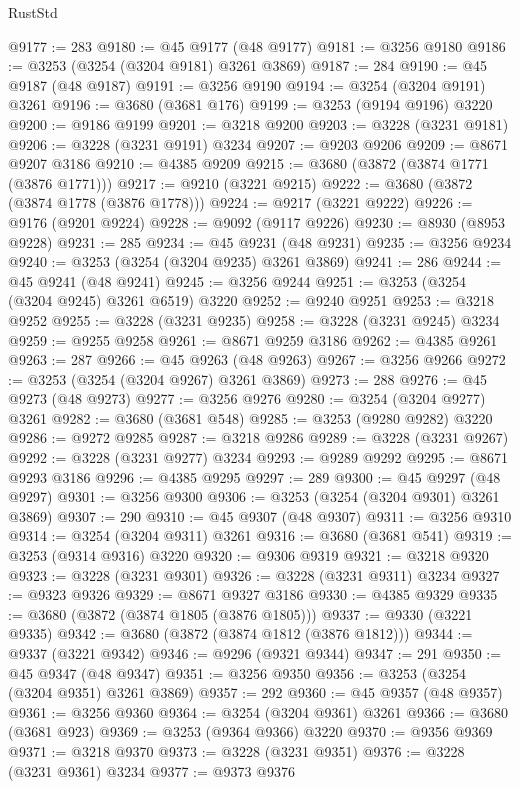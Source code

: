\begin{lexlean}{RustStd}
\begin{coremodule}
@9177 := 283
@9180 := @45 @9177 (@48 @9177)
@9181 := @3256 @9180
@9186 := @3253 (@3254 (@3204 @9181) @3261 @3869)
@9187 := 284
@9190 := @45 @9187 (@48 @9187)
@9191 := @3256 @9190
@9194 := @3254 (@3204 @9191) @3261
@9196 := @3680 (@3681 @176)
@9199 := @3253 (@9194 @9196) @3220
@9200 := @9186 @9199
@9201 := @3218 @9200
@9203 := @3228 (@3231 @9181)
@9206 := @3228 (@3231 @9191) @3234
@9207 := @9203 @9206
@9209 := @8671 @9207 @3186
@9210 := @4385 @9209
@9215 := @3680 (@3872 (@3874 @1771 (@3876 @1771)))
@9217 := @9210 (@3221 @9215)
@9222 := @3680 (@3872 (@3874 @1778 (@3876 @1778)))
@9224 := @9217 (@3221 @9222)
@9226 := @9176 (@9201 @9224)
@9228 := @9092 (@9117 @9226)
@9230 := @8930 (@8953 @9228)
@9231 := 285
@9234 := @45 @9231 (@48 @9231)
@9235 := @3256 @9234
@9240 := @3253 (@3254 (@3204 @9235) @3261 @3869)
@9241 := 286
@9244 := @45 @9241 (@48 @9241)
@9245 := @3256 @9244
@9251 := @3253 (@3254 (@3204 @9245) @3261 @6519) @3220
@9252 := @9240 @9251
@9253 := @3218 @9252
@9255 := @3228 (@3231 @9235)
@9258 := @3228 (@3231 @9245) @3234
@9259 := @9255 @9258
@9261 := @8671 @9259 @3186
@9262 := @4385 @9261
@9263 := 287
@9266 := @45 @9263 (@48 @9263)
@9267 := @3256 @9266
@9272 := @3253 (@3254 (@3204 @9267) @3261 @3869)
@9273 := 288
@9276 := @45 @9273 (@48 @9273)
@9277 := @3256 @9276
@9280 := @3254 (@3204 @9277) @3261
@9282 := @3680 (@3681 @548)
@9285 := @3253 (@9280 @9282) @3220
@9286 := @9272 @9285
@9287 := @3218 @9286
@9289 := @3228 (@3231 @9267)
@9292 := @3228 (@3231 @9277) @3234
@9293 := @9289 @9292
@9295 := @8671 @9293 @3186
@9296 := @4385 @9295
@9297 := 289
@9300 := @45 @9297 (@48 @9297)
@9301 := @3256 @9300
@9306 := @3253 (@3254 (@3204 @9301) @3261 @3869)
@9307 := 290
@9310 := @45 @9307 (@48 @9307)
@9311 := @3256 @9310
@9314 := @3254 (@3204 @9311) @3261
@9316 := @3680 (@3681 @541)
@9319 := @3253 (@9314 @9316) @3220
@9320 := @9306 @9319
@9321 := @3218 @9320
@9323 := @3228 (@3231 @9301)
@9326 := @3228 (@3231 @9311) @3234
@9327 := @9323 @9326
@9329 := @8671 @9327 @3186
@9330 := @4385 @9329
@9335 := @3680 (@3872 (@3874 @1805 (@3876 @1805)))
@9337 := @9330 (@3221 @9335)
@9342 := @3680 (@3872 (@3874 @1812 (@3876 @1812)))
@9344 := @9337 (@3221 @9342)
@9346 := @9296 (@9321 @9344)
@9347 := 291
@9350 := @45 @9347 (@48 @9347)
@9351 := @3256 @9350
@9356 := @3253 (@3254 (@3204 @9351) @3261 @3869)
@9357 := 292
@9360 := @45 @9357 (@48 @9357)
@9361 := @3256 @9360
@9364 := @3254 (@3204 @9361) @3261
@9366 := @3680 (@3681 @923)
@9369 := @3253 (@9364 @9366) @3220
@9370 := @9356 @9369
@9371 := @3218 @9370
@9373 := @3228 (@3231 @9351)
@9376 := @3228 (@3231 @9361) @3234
@9377 := @9373 @9376

\end{coremodule}
\end{lexlean}
